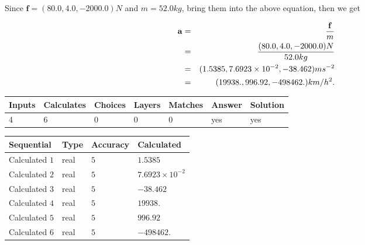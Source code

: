 \documentclass[12pt]{article}
\begin{document}
Since $\mathbf{f}=( %
80.0,  %
4.0,  %
-2000.0 )N$
and $m= %
52.0 kg$, bring them into the above equation, then we get
 
\begin{eqnarray*}
\mathbf{a}&=&\frac{\mathbf{f}}m  \\
&=&\frac{(
80.0 ,
4.0 ,
-2000.0 )N
}{ %
52.0 kg}  \\
&=&(
1.5385 ,
7.6923 \times 10^{-2},
-38.462
)ms^{-2} \\
&=&(
19938. ,
996.92 ,
-498462.
)km/h^2.
\end{eqnarray*}
 
 
 
\noindent{}
 
 

 
\vspace{0.3in}
   
   
   
   
\noindent\begin{tabular}{|l|l|l|l|l|l|l|}
 \hline
Inputs & Calculates & Choices & Layers & Matches & Answer & Solution \\ \hline
           4  & 
           6  & 
           0
  & 
           0  & 
           0  & 
  yes & 
  yes 
  \\ \hline
 \end{tabular}
   
   
   
   
\noindent{}
   
   
  
  
\noindent\begin{tabular}{|l|l|l|l|}
\hline
 Sequential & Type & Accuracy & Calculated \\ 
\hline
 
 
  Calculated $            1 $ & real & $            5  $ & 
 $ 1.5385 $ 
 \\  \hline  
 
 
  Calculated $            2 $ & real & $            5  $ & 
 $ 7.6923 \times 10^{-2} $ 
 \\  \hline  
 
 
  Calculated $            3 $ & real & $            5  $ & 
 $ -38.462 $ 
 \\  \hline  
 
 
  Calculated $            4 $ & real & $            5  $ & 
 $ 19938. $ 
 \\  \hline  
 
 
  Calculated $            5 $ & real & $            5  $ & 
 $ 996.92 $ 
 \\  \hline  
 
 
  Calculated $            6 $ & real & $            5  $ & 
 $ -498462. $ 
 \\  \hline  
 \end{tabular}
   
\end{document}
